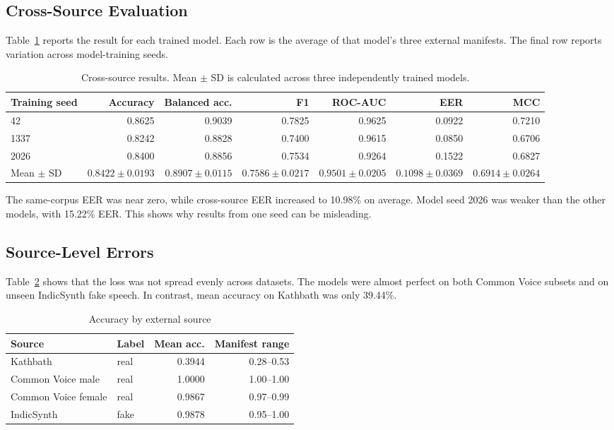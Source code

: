 \documentclass[conference]{IEEEtran}
\begin{document}
\subsection{Cross-Source Evaluation}
Table~\ref{tab:main-results} reports the result for each trained model. Each
row is the average of that model's three external manifests. The final row
reports variation across model-training seeds.

\begin{table}[t]
\caption{Cross-source results. Mean $\pm$ SD is calculated across three independently trained models.}
\label{tab:main-results}
\centering
\begin{tabular}{lrrrrrr}
\toprule
Training seed & Accuracy & Balanced acc. & F1 & ROC-AUC & EER & MCC \\
\midrule
42   & 0.8625 & 0.9039 & 0.7825 & 0.9625 & 0.0922 & 0.7210 \\
1337 & 0.8242 & 0.8828 & 0.7400 & 0.9615 & 0.0850 & 0.6706 \\
2026 & 0.8400 & 0.8856 & 0.7534 & 0.9264 & 0.1522 & 0.6827 \\
\midrule
Mean $\pm$ SD & $0.8422\pm0.0193$ & $0.8907\pm0.0115$ & $0.7586\pm0.0217$ & $0.9501\pm0.0205$ & $0.1098\pm0.0369$ & $0.6914\pm0.0264$ \\
\bottomrule
\end{tabular}
\end{table}

The same-corpus EER was near zero, while cross-source EER increased to
10.98\% on average. Model seed 2026 was weaker than the other models, with
15.22\% EER. This shows why results from one seed can be misleading.

\subsection{Source-Level Errors}
Table~\ref{tab:source-results} shows that the loss was not spread evenly
across datasets. The models were almost perfect on both Common Voice subsets
and on unseen IndicSynth fake speech. In contrast, mean accuracy on Kathbath
was only 39.44\%.

\begin{table}[t]
\caption{Accuracy by external source}
\label{tab:source-results}
\centering
\small
\begin{tabular}{llrr}
\toprule
Source & Label & Mean acc. & Manifest range \\
\midrule
Kathbath & real & 0.3944 & 0.28--0.53 \\
Common Voice male & real & 1.0000 & 1.00--1.00 \\
Common Voice female & real & 0.9867 & 0.97--0.99 \\
IndicSynth & fake & 0.9878 & 0.95--1.00 \\
\bottomrule
\end{tabular}
\end{table}
\end{document}
